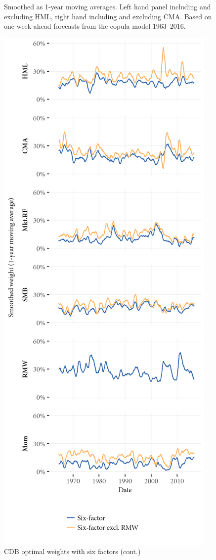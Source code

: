 \begin{figure}[htbp]
  \begin{longcaption}
    Smoothed as 1-year moving averages. Left hand panel including and excluding HML, right hand including and excluding CMA. Based on one-week-ahead forecasts from the copula model 1963--2016.
  \end{longcaption}
  \label{fig:cdb_optimal_6}
\end{figure}

\begin{figure}[htbp]
  \ContinuedFloat
  \centering
  \includegraphics[scale=1]{graphics/weights/appendix_Weights_CDB_6F_6F_EXCL_RMW.png}
  \footnotesize
  \caption{CDB optimal weights with six factors (cont.)}
\end{figure}